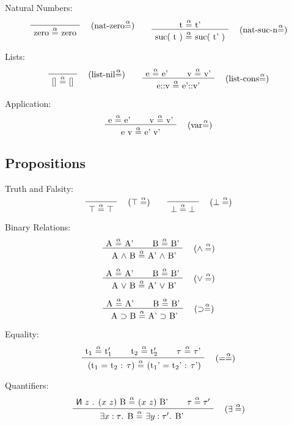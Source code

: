 \documentclass[twoside,a4paper]{article}
\theoremstyle{definition}
\newcommand\new[0]{\reflectbox{\ensuremath{\mathsf{N}}}}
\begin{document}
Natural Numbers:
\[
\AxiomC{}
\RightLabel{\quad (nat-zero$\overset{\alpha}=$)}
\UnaryInfC{zero $\overset{\alpha}=$ zero}
\DisplayProof
\quad
\quad
\AxiomC{t  $\overset{\alpha}=$  t'}
\RightLabel{\quad (nat-suc-n$\overset{\alpha}=$)}
\UnaryInfC{suc( t ) $\overset{\alpha}=$ suc( t' )}
\DisplayProof
\]

Lists:
\[
\AxiomC{}
\RightLabel{\quad (list-nil$\overset{\alpha}=$)}
\UnaryInfC{[] $\overset{\alpha}=$ []}
\DisplayProof
\quad
\quad
\AxiomC{e  $\overset{\alpha}=$  e'}
\AxiomC{v  $\overset{\alpha}=$  v'}
\RightLabel{\quad (list-cons$\overset{\alpha}=$)}
\BinaryInfC{e::v $\overset{\alpha}=$ e'::v'}
\DisplayProof
\]

Application:
\[
\AxiomC{e $\overset{\alpha}=$ e'}
\AxiomC{v $\overset{\alpha}=$ v'}
\RightLabel{\quad (var$\overset{\alpha}=$)}
\BinaryInfC{e v $\overset{\alpha}=$ e' v'}
\DisplayProof
\]

\subsection{Propositions}
Truth and Falsity:
\[
\AxiomC{}
\RightLabel{\quad ($\top\overset{\alpha}=$)}
\UnaryInfC{$\top \overset{\alpha}= \top$}
\DisplayProof
\quad
\quad
\AxiomC{}
\RightLabel{\quad ($\bot\overset{\alpha}=$)}
\UnaryInfC{$\bot \overset{\alpha}= \bot$}
\DisplayProof
\]

Binary Relations:
\[
\AxiomC{A $\overset{\alpha}=$ A'}
\AxiomC{B $\overset{\alpha}=$ B'}
\RightLabel{\quad ($\wedge\overset{\alpha}=$)}
\BinaryInfC{ A $\wedge$ B $\overset{\alpha}=$ A' $\wedge$ B'}
\DisplayProof
\]

\[
\AxiomC{A $\overset{\alpha}=$ A'}
\AxiomC{B $\overset{\alpha}=$ B'}
\RightLabel{\quad ($\vee\overset{\alpha}=$)}
\BinaryInfC{ A $\vee$ B $\overset{\alpha}=$ A' $\vee$ B'}
\DisplayProof
\]

\[
\AxiomC{A $\overset{\alpha}=$ A'}
\AxiomC{B $\overset{\alpha}=$ B'}
\RightLabel{\quad ($\supset\overset{\alpha}=$)}
\BinaryInfC{ A $\supset$ B $\overset{\alpha}=$ A' $\supset$ B'}
\DisplayProof
\]

Equality:
\[
\AxiomC{t$_1$ $\overset{\alpha}=$ t$_1'$}
\AxiomC{t$_2$ $\overset{\alpha}=$ t$_2'$}
\AxiomC{$\tau$ $\overset{\alpha}=$ $\tau$'}
\RightLabel{\quad ($=\overset{\alpha}=$)}
\TrinaryInfC{ (t$_1$ = t$_2$ : $\tau$) $\overset{\alpha}=$ (t$_1$' = t$_2$' : $\tau$')}
\DisplayProof
\]

Quantifiers:
\[
\AxiomC{$\new$ $z$ . $(x$ $z)$ B $\overset{\alpha}=$ $(x$ $z)$ B'}
\AxiomC{$\tau \overset{\alpha}= \tau'$}
\RightLabel{\quad ($\exists\overset{\alpha}=$)}
\BinaryInfC{$\exists x : \tau$. B $\overset{\alpha}=$ $\exists y : \tau' $. B' }
\DisplayProof
\]
\end{document}
